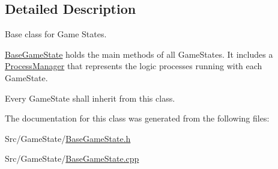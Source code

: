 \subsection{Detailed Description}
Base class for Game States. 

\hyperlink{classBaseGameState}{Base\-Game\-State} holds the main methods of all Game\-States. It includes a \hyperlink{classProcessManager}{Process\-Manager} that represents the logic processes running with each Game\-State.

Every Game\-State shall inherit from this class. 

The documentation for this class was generated from the following files\-:\begin{DoxyCompactItemize}
\item 
Src/\-Game\-State/\hyperlink{BaseGameState_8h}{Base\-Game\-State.\-h}\item 
Src/\-Game\-State/\hyperlink{BaseGameState_8cpp}{Base\-Game\-State.\-cpp}\end{DoxyCompactItemize}
